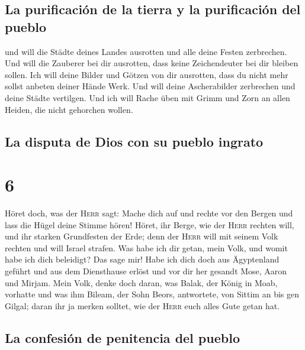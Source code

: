 \hypertarget{la-purificaciuxf3n-de-la-tierra-y-la-purificaciuxf3n-del-pueblo}{%
\subsection{La purificación de la tierra y la purificación del
pueblo}\label{la-purificaciuxf3n-de-la-tierra-y-la-purificaciuxf3n-del-pueblo}}

 und will die Städte deines Landes ausrotten und alle
deine Festen zerbrechen.  Und will die Zauberer bei dir
ausrotten, dass keine Zeichendeuter bei dir bleiben sollen.
 Ich will deine Bilder und Götzen von dir ausrotten, dass
du nicht mehr sollst anbeten deiner Hände Werk.  Und will
deine Ascherabilder zerbrechen und deine Städte vertilgen.
 Und ich will Rache üben mit Grimm und Zorn an allen
Heiden, die nicht gehorchen wollen.

\hypertarget{la-disputa-de-dios-con-su-pueblo-ingrato}{%
\subsection{La disputa de Dios con su pueblo
ingrato}\label{la-disputa-de-dios-con-su-pueblo-ingrato}}

\hypertarget{section-5}{%
\section{6}\label{section-5}}

 Höret doch, was der \textsc{Herr} sagt: Mache dich auf
und rechte vor den Bergen und lass die Hügel deine Stimme hören!
 Höret, ihr Berge, wie der \textsc{Herr} rechten will, und
ihr starken Grundfesten der Erde; denn der \textsc{Herr} will mit seinem
Volk rechten und will Israel strafen.  Was habe ich dir
getan, mein Volk, und womit habe ich dich beleidigt? Das sage mir!
 Habe ich dich doch aus Ägyptenland geführt und aus dem
Diensthause erlöst und vor dir her gesandt Mose, Aaron und Mirjam.
 Mein Volk, denke doch daran, was Balak, der König in
Moab, vorhatte und was ihm Bileam, der Sohn Beors, antwortete, von
Sittim an bis gen Gilgal; daran ihr ja merken solltet, wie der
\textsc{Herr} euch alles Gute getan hat.

\hypertarget{la-confesiuxf3n-de-penitencia-del-pueblo}{%
\subsection{La confesión de penitencia del
pueblo}\label{la-confesiuxf3n-de-penitencia-del-pueblo}}


